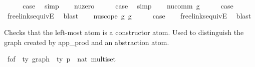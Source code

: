 \begin{isabellebody}
\ \ \isamarkupfalse%
\ \isamarkupfalse%
\ {\isacharquery}{\kern0pt}case\ \isamarkupfalse%
\ simp\isanewline
{}\isamarkupfalse%
\isanewline
\ \ \isamarkupfalse%
\ {\isacharparenleft}{\kern0pt}nu{\isacharunderscore}{\kern0pt}zero{\isacharparenright}{\kern0pt}\isanewline
\ \ \isamarkupfalse%
\ \isamarkupfalse%
\ {\isacharquery}{\kern0pt}case\ \isamarkupfalse%
\ simp\isanewline
{}\isamarkupfalse%
\isanewline
\ \ \isamarkupfalse%
\ {\isacharparenleft}{\kern0pt}nu{\isacharunderscore}{\kern0pt}comm\ g{\isacharparenright}{\kern0pt}\isanewline
\ \ \isamarkupfalse%
\ \isamarkupfalse%
\ {\isacharquery}{\kern0pt}case\isanewline
\ \ \isamarkupfalse%
\ freelinks{\isacharunderscore}{\kern0pt}equiv{\isacharunderscore}{\kern0pt}E{}\ \isamarkupfalse%
\ blast\isanewline
{}\isamarkupfalse%
\isanewline
\ \ \isamarkupfalse%
\ {\isacharparenleft}{\kern0pt}nu{\isacharunderscore}{\kern0pt}scope\ g{}\ g{}{\isacharparenright}{\kern0pt}\isanewline
\ \ \isamarkupfalse%
\ \isamarkupfalse%
\ {\isacharquery}{\kern0pt}case\isanewline
\ \ \isamarkupfalse%
\ freelinks{\isacharunderscore}{\kern0pt}equiv{\isacharunderscore}{\kern0pt}E{}{}\ \isamarkupfalse%
\ blast\isanewline
{}\isamarkupfalse%
%
\endisatagproof
{\isafoldproof}%
%
\isadelimproof
%
\endisadelimproof
%
\isadelimdocument
%
\endisadelimdocument
%
\isatagdocument
%
\isamarkuptrue%
%
\endisatagdocument
{\isafolddocument}%
%
\isadelimdocument
%
\endisadelimdocument
%
\begin{isamarkuptext}%
Checks that the left-most atom is a constructor atom.
Used to distinguish the graph created by app\_prod and an abstraction atom.%
\end{isamarkuptext}\isamarkuptrue%
\isamarkupfalse%
\ f{\isacharunderscore}{\kern0pt}of\ {\isacharcolon}{\kern0pt}{\isacharcolon}{\kern0pt}\ {\isachardoublequoteopen}{\isacharprime}{\kern0pt}ty\ graph\ {\isacharequal}{\kern0pt}{\isachargreater}{\kern0pt}\ {\isacharparenleft}{\kern0pt}{\isacharprime}{\kern0pt}ty\ p\ {\isacharasterisk}{\kern0pt}\ nat{\isacharparenright}{\kern0pt}\ multiset{\isachardoublequoteclose}\isanewline

\end{isabellebody}
